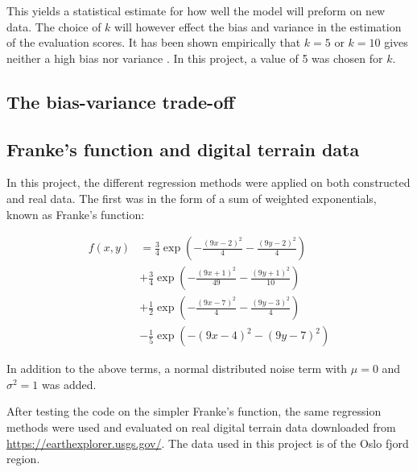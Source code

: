 This yields a statistical estimate for how well the model will preform on new data. The choice of $k$ will however effect the bias and variance in the estimation of the evaluation scores. It has been shown empirically that $k=5$ or $k=10$ gives neither a high bias nor variance \citep{james2013introduction}. In this project, a value of 5 was chosen for $k$. 

\subsection{The bias-variance trade-off}

\subsection{Franke's function and digital terrain data}
In this project, the different regression methods were applied on both constructed and real data. The first was in the form of a sum of weighted exponentials, known as Franke's function:

\begin{align*}
	f\left(x,y\right) &=\frac{3}{4}\exp\left(-\frac{\left(9x-2\right)^2}{4}-\frac{\left(9y-2\right)^2}{4} \right) \\
	&+\frac{3}{4}\exp\left(-\frac{\left(9x+1\right)^2}{49}-\frac{\left(9y+1\right)^2}{10} \right) \\
	&+\frac{1}{2}\exp\left(-\frac{\left(9x-7\right)^2}{4}-\frac{\left(9y-3\right)^2}{4} \right) \\
	&-\frac{1}{5}\exp\left(-\left(9x-4\right)^2-\left(9y-7\right)^2 \right)	
\end{align*}

In addition to the above terms, a normal distributed noise term with $\mu = 0$ and $\sigma^2 = 1$ was added. 

After testing the code on the simpler Franke's function, the same regression methods were used and evaluated on real digital terrain data downloaded from \url{https://earthexplorer.usgs.gov/}. The data used in this project is of the Oslo fjord region. 
